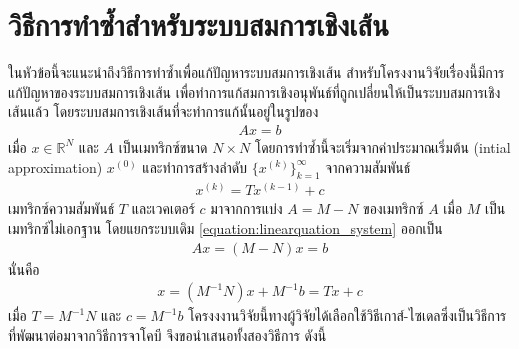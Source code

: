 \section{วิธีการทำซ้ำสำหรับระบบสมการเชิงเส้น}


\hspace{1cm}  ในหัวข้อนี้จะแนะนำถึงวิธีการทำซ้ำเพื่อแก้ปัญหาระบบสมการเชิงเส้น สำหรับโครงงานวิจัยเรื่องนี้มีการแก้ปัญหาของระบบสมการเชิงเส้น เพื่อทำการแก้สมการเชิงอนุพันธ์ที่ถูกเปลี่ยนให้เป็นระบบสมการเชิงเส้นแล้ว โดยระบบสมการเชิงเส้นที่จะทำการแก้นั้นอยู่ในรูปของ
\begin{align}
    Ax = b
    \label{equation:linearquation_system}
\end{align}
เมื่อ $x \in \mathbb{R}^{N}$ และ $A$ เป็นเมทริกซ์ขนาด $N \times N$ โดยการทำซ้ำนี้จะเริ่มจากค่าประมาณเริ่มต้น (intial approximation) $x^{(0)}$ และทำการสร้างลำดับ $\{ x^{(k)} \}_{k=1}^\infty$ จากความสัมพันธ์
\begin{align}
    x^{(k)} = Tx^{(k-1)} + c
\end{align}
เมทริกซ์ความสัมพันธ์ $T$ และเวคเตอร์ $c$ มาจากการแบ่ง $A = M-N$ ของเมทริกซ์ $A$ เมื่อ $M$ เป็นเมทริกซ์ไม่เอกฐาน โดยแยกระบบเดิม \ref{equation:linearquation_system} ออกเป็น
\begin{align}
    Ax = (M - N)x = b
\end{align}
นั่นคือ
\begin{align}
    x = (M^{-1} N)x + M^{-1}b = Tx + c
\end{align}
เมื่อ $T = M^{-1}N$ และ $c = M^{-1}b$
\hspace{1cm} โครงงงานวิจัยนี้ทางผู้วิจัยได้เลือกใช้วิธีเกาส์-ไซเดลซึ่งเป็นวิธีการที่พัฒนาต่อมาจากวิธีการจาโคบี จึงขอนำเสนอทั้งสองวิธีการ ดังนี้

